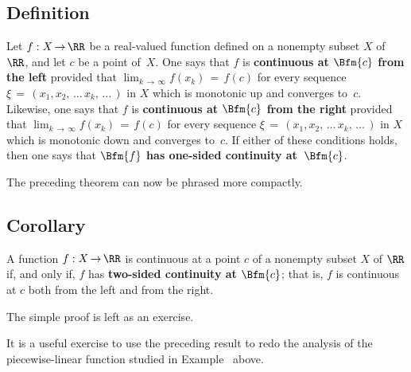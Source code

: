 \V

            \subsection{\small{\bf Definition}}
            \label{DefD20.55A}

\V

        Let $f:X \,{\rightarrow}\, {\RR}$ be a real-valued function defined on a nonempty subset $X$ of~${\RR}$, and let $c$ be a point of~$X$.
    One says that $f$ is {\bf continuous at $\Bfm{c}$ from the left} provided that $\lim_{k \,{\rightarrow}\, {\infty}} f(x_{k}) \,=\, f(c)$
    for every sequence ${\xi} \,=\, (x_{1}, x_{2},\,{\ldots}\,x_{k},\,{\ldots}\,)$ in $X$
    which is monotonic up and converges to~$c$. Likewise, one says that $f$ is {\bf continuous at $\Bfm{c}$ from the right} provided that $\lim_{k \,{\rightarrow}\, {\infty}} f(x_{k}) \,=\, f(c)$
    for every sequence ${\xi} \,=\, (x_{1}, x_{2},\,{\ldots}\,x_{k},\,{\ldots}\,)$ in $X$
    which is monotonic down and converges to~$c$. If either of these conditions holds, then one says that {\bf $\Bfm{f}$ has one-sided continuity at~$\Bfm{c}$}.


\V

        The preceding theorem can now be phrased more compactly.

\V

            \subsection{\small{\bf Corollary}}
            \label{CorD20.55A}

\V

        A function $f:X \,{\rightarrow}\, {\RR}$ is continuous at a point $c$ of a nonempty subset $X$ of ${\RR}$ if, and only if,
    $f$ has {\bf two-sided continuity at $\Bfm{c}$};
    that is, $f$ is continuous at $c$ both from the left and from the right.

\V

        The simple proof is left as an exercise.

\V

    It is a useful exercise to use the preceding result to redo the analysis of the piecewise-linear function studied in Example~ above.


